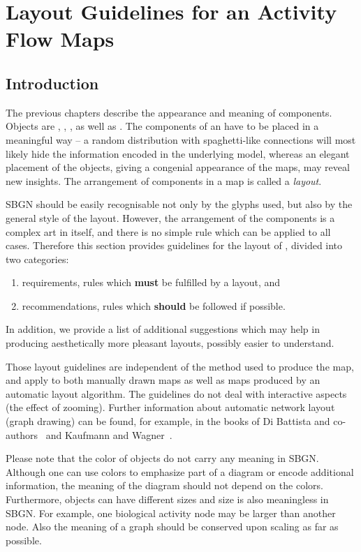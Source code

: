 \chapter{Layout Guidelines for an Activity Flow Maps}
\label{chp:af:layout}

\section{Introduction}

The previous chapters describe the appearance and meaning of \SBGNAFLone components. Objects are , , ,  as well as . The components of an \AFm have to be placed in a meaningful way -- a random distribution with spaghetti-like connections will most likely hide the information encoded in the underlying model, whereas an elegant placement of the objects, giving a congenial appearance of the maps, may reveal new insights. The arrangement of components in a map is called a \emph{layout}.

SBGN \AFs should be easily recognisable not only by the glyphs used, but also by the general style of the layout. However, the arrangement of the components is a complex art in itself, and there is no simple rule which can be applied to all cases. Therefore this section provides guidelines for the layout of \AFms, divided into two categories:
\begin{enumerate}
  \item requirements, \ie rules which \textbf{must} be fulfilled by a layout, and
  \item recommendations, \ie rules which \textbf{should} be followed if possible.
\end{enumerate}
In addition, we provide a list of additional suggestions which may help in producing aesthetically more pleasant layouts, possibly easier to understand.

Those layout guidelines are independent of the method used to produce the map, and apply to both manually drawn maps as well as maps produced by an automatic layout algorithm. The guidelines do not deal with interactive aspects (\eg the effect of zooming). Further information about automatic network layout (graph drawing) can be found, for example, in the books of Di Battista and co-authors~\cite{DiBattista:1998} and Kaufmann and Wagner~\cite{Kaufmann:2001}.

Please note that the color of objects do not carry any meaning in SBGN. Although one can use colors to emphasize part of a diagram or encode additional information, the meaning of the diagram should not depend on the colors. Furthermore, objects can have different sizes and size is also meaningless in SBGN. For example, one biological activity node may be larger than another node. Also the meaning of a graph should be conserved upon scaling as far as possible.

